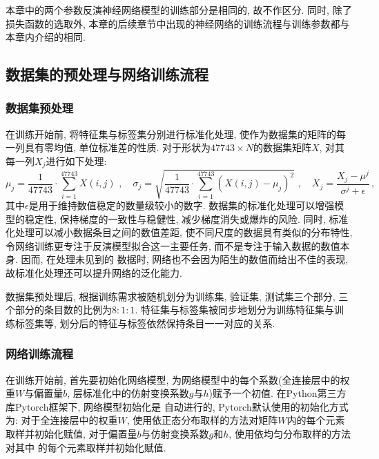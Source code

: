 \documentclass[a4paper,punct=banjiao,twoside]{ctexrep}
\theoremstyle{plain}
\theoremstyle{definition}
\theoremstyle{remark}
\begin{document}
本章中的两个参数反演神经网络模型的训练部分是相同的, 故不作区分. 同时, 除了损失函数的选取外, 本章的后续章节中出现的神经网络的训练流程与训练参数都与本章内介绍的相同.
\subsection{数据集的预处理与网络训练流程}

\subsubsection*{数据集预处理}
在训练开始前, 将特征集与标签集分别进行标准化处理, 使作为数据集的矩阵的每一列具有零均值, 单位标准差的性质. 对于形状为$47743\times N$的数据集矩阵$X$, 对其每一列$X_j$进行如下处理:
$$
\mu_j = \frac{1}{47743}\cdot \sum_{i = 1}^{47743}  X(i,j) \,\,, \quad  \sigma_j = \sqrt{\frac{1}{47743}\cdot \sum_{i = 1}^{47743}(X(i,j)-\mu_j)^2  } \,\,, \quad X_j  = \frac{X_j - \mu^j}{\sigma^j + \epsilon} \,,
$$
其中$\epsilon$是用于维持数值稳定的数量级较小的数字. 数据集的标准化处理可以增强模型的稳定性, 保持梯度的一致性与稳健性, 减少梯度消失或爆炸的风险\cite{21}. 同时, 标准化处理可以减小数据条目之间的数值差距, 使不同尺度的数据具有类似的分布特性, 令网络训练更专注于反演模型拟合这一主要任务, 而不是专注于输入数据的数值本身. 因而, 在处理未见到的
数据时, 网络也不会因为陌生的数值而给出不佳的表现, 故标准化处理还可以提升网络的泛化能力\cite{22}.

数据集预处理后, 根据训练需求被随机划分为训练集, 验证集, 测试集三个部分, 三个部分的条目数的比例为$8:1:1$. 特征集与标签集被同步地划分为训练特征集与训练标签集等, 划分后的特征与标签依然保持条目一一对应的关系. 

\subsubsection*{网络训练流程}
在训练开始前, 首先要初始化网络模型, 为网络模型中的每个系数(全连接层中的权重$W$与偏置量$b$, 层标准化中的仿射变换系数$g$与$h$)赋予一个初值. 在Python第三方库Pytorch框架下, 网络模型初始化是
自动进行的, Pytorch默认使用的初始化方式为: 对于全连接层中的权重$W$, 使用依正态分布取样的方法对矩阵$W$内的每个元素取样并初始化赋值, 对于偏置量$b$与仿射变换系数$g$和$h$, 使用依均匀分布取样的方法对其中
的每个元素取样并初始化赋值\cite{31}.
\end{document}
